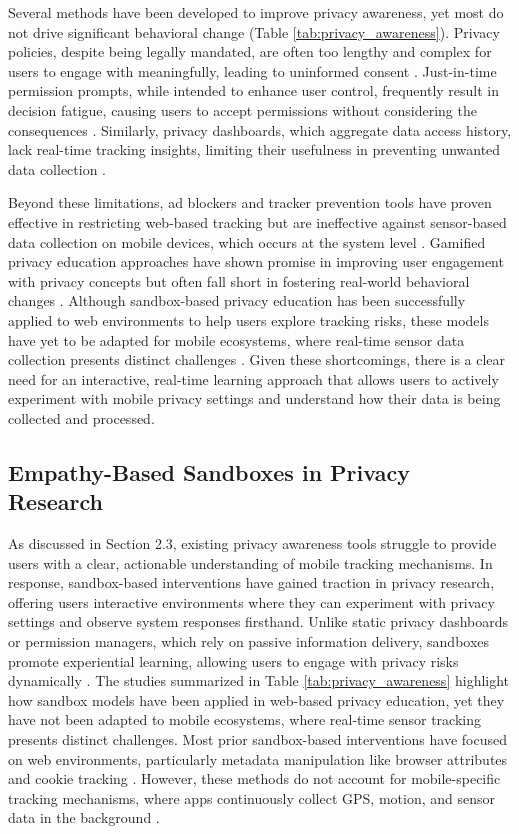 \documentclass[acmlarge, nonacm]{acmart}
\begin{document}
Several methods have been developed to improve privacy awareness, yet most do not drive significant behavioral change (Table \ref{tab:privacy_awareness}). Privacy policies, despite being legally mandated, are often too lengthy and complex for users to engage with meaningfully, leading to uninformed consent \cite{burkhardt2023privacy}. Just-in-time permission prompts, while intended to enhance user control, frequently result in decision fatigue, causing users to accept permissions without considering the consequences \cite{bilogrevic2021shhh}. Similarly, privacy dashboards, which aggregate data access history, lack real-time tracking insights, limiting their usefulness in preventing unwanted data collection \cite{narayanan2024real}.

Beyond these limitations, ad blockers and tracker prevention tools have proven effective in restricting web-based tracking but are ineffective against sensor-based data collection on mobile devices, which occurs at the system level \cite{bian2021supply}. Gamified privacy education approaches have shown promise in improving user engagement with privacy concepts but often fall short in fostering real-world behavioral changes \cite{idierukevbe2024bridging}. Although sandbox-based privacy education has been successfully applied to web environments to help users explore tracking risks, these models have yet to be adapted for mobile ecosystems, where real-time sensor data collection presents distinct challenges \cite{Chaoran2023EmpathySandbox}. Given these shortcomings, there is a clear need for an interactive, real-time learning approach that allows users to actively experiment with mobile privacy settings and understand how their data is being collected and processed.

\subsection{Empathy-Based Sandboxes in Privacy Research}
As discussed in Section 2.3, existing privacy awareness tools struggle to provide users with a clear, actionable understanding of mobile tracking mechanisms. In response, sandbox-based interventions have gained traction in privacy research, offering users interactive environments where they can experiment with privacy settings and observe system responses firsthand. Unlike static privacy dashboards or permission managers, which rely on passive information delivery, sandboxes promote experiential learning, allowing users to engage with privacy risks dynamically \cite{Chaoran2023EmpathySandbox}. The studies summarized in Table \ref{tab:privacy_awareness} highlight how sandbox models have been applied in web-based privacy education, yet they have not been adapted to mobile ecosystems, where real-time sensor tracking presents distinct challenges. Most prior sandbox-based interventions have focused on web environments, particularly metadata manipulation like browser attributes and cookie tracking \cite{van2024we}. However, these methods do not account for mobile-specific tracking mechanisms, where apps continuously collect GPS, motion, and sensor data in the background \cite{bella}.
\end{document}
